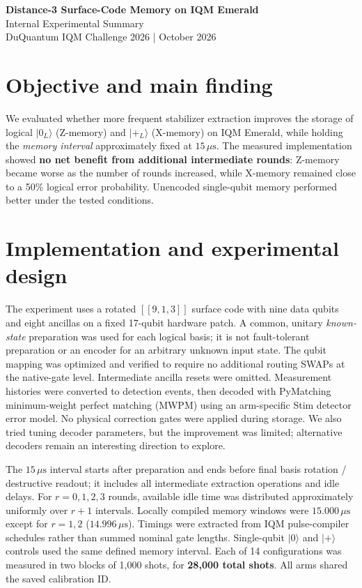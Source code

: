 \documentclass[9pt,letterpaper]{article}
\begin{document}
\begin{center}
{\Large\bfseries Distance-3 Surface-Code Memory on IQM Emerald}\\[4pt]
{\large Internal Experimental Summary}\\[3pt]
{\small DuQuantum IQM Challenge 2026 \;| October 2026}
\end{center}
\vspace{-6pt}
\section*{Objective and main finding}
We evaluated whether more frequent stabilizer extraction improves the storage of logical $|0_L\rangle$ (Z-memory) and $|+_L\rangle$ (X-memory) on IQM Emerald, while holding the \emph{memory interval} approximately fixed at $15\,\mu\mathrm{s}$. The measured implementation showed \textbf{no net benefit from additional intermediate rounds}: Z-memory became worse as the number of rounds increased, while X-memory remained close to a 50\% logical error probability. Unencoded single-qubit memory performed better under the tested conditions. 

\section*{Implementation and experimental design}
The experiment uses a rotated $[[9,1,3]]$ surface code with nine data qubits and eight ancillas on a fixed 17-qubit hardware patch. A common, unitary \emph{known-state} preparation was used for each logical basis; it is not fault-tolerant preparation or an encoder for an arbitrary unknown input state. The qubit mapping was optimized and verified to require no additional routing SWAPs at the native-gate level. Intermediate ancilla resets were omitted. Measurement histories were converted to detection events, then decoded with PyMatching minimum-weight perfect matching (MWPM) using an arm-specific Stim detector error model. No physical correction gates were applied during storage. We also tried tuning decoder parameters, but the improvement was limited; alternative decoders remain an interesting direction to explore.

The $15\,\mu\mathrm{s}$ interval starts after preparation and ends before final basis rotation / destructive readout; it includes all intermediate extraction operations and idle delays. For $r=0,1,2,3$ rounds, available idle time was distributed approximately uniformly over $r+1$ intervals. Locally compiled memory windows were $15.000\,\mu\mathrm{s}$ except for $r=1,2$ ($14.996\,\mu\mathrm{s}$). Timings were extracted from IQM pulse-compiler schedules rather than summed nominal gate lengths. Single-qubit $|0\rangle$ and $|+\rangle$ controls used the same defined memory interval. Each of 14 configurations was measured in two blocks of 1,000 shots, for \textbf{28,000 total shots}. All arms shared the saved calibration ID.
\end{document}
